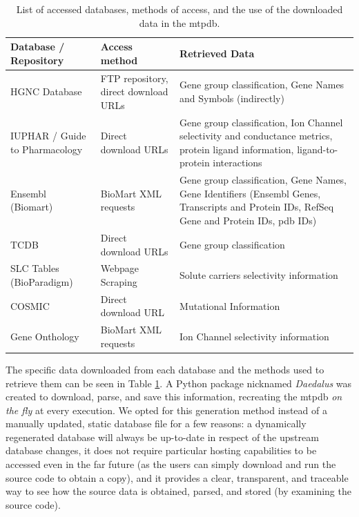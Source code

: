 \begin{table}
\begin{tabularx}{\textwidth}{|X|X|X|}
        \hline
    \textbf{Database / Repository}  & \textbf{Access method}
        & \textbf{Retrieved Data} \\
        \hline
        \hline
    HGNC Database                   & FTP repository, direct download URLs
        & Gene group classification, Gene Names and Symbols (indirectly) \\
        \hline
    IUPHAR / Guide to Pharmacology  & Direct download URLs
        & Gene group classification, Ion Channel selectivity and conductance
        metrics, protein ligand information, ligand-to-protein interactions \\
        \hline
    Ensembl (Biomart)               & BioMart XML requests
        & Gene group classification, Gene Names, Gene Identifiers (Ensembl Genes,
        Transcripts and Protein IDs, RefSeq Gene and Protein IDs, pdb IDs) \\
        \hline
    TCDB                            & Direct download URLs
        & Gene group classification \\
        \hline
    SLC Tables (BioParadigm)        & Webpage Scraping
        & Solute carriers selectivity information \\
        \hline
    COSMIC                          & Direct download URL
        & Mutational Information \\
        \hline
    Gene Onthology                  & BioMart XML requests
        & Ion Channel selectivity information \\
        \hline
\end{tabularx}
\caption{List of accessed databases, methods of access, and the use of the
    downloaded data in the \acrlong{mtpdb}.}
\label{tab:dataSources}
\end{table}

The specific data downloaded from each database and the methods used to retrieve
them can be seen in Table \ref{tab:dataSources}. A Python package nicknamed
\textit{Daedalus} was created to download, parse, and save this information,
recreating the \gls{mtpdb} \textit{on the fly} at every execution. We opted for
this generation method instead of a manually updated, static database file for a
few reasons: a dynamically regenerated database will always be up-to-date in
respect of the upstream database changes, it does not require particular hosting
capabilities to be accessed even in the far future (as the users can simply
download and run the source code to obtain a copy), and it provides a clear,
transparent, and traceable way to see how the source data is obtained, parsed,
and stored (by examining the source code).

